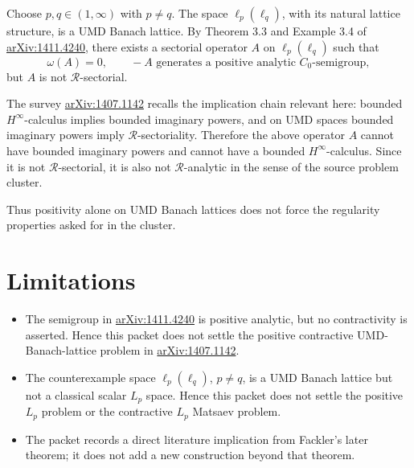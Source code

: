 \documentclass[11pt]{article}
\newcommand{\arxiv}[1]{\href{https://arxiv.org/abs/#1}{arXiv:#1}}
\newcommand{\R}{\mathcal R}
\begin{document}
Choose \(p,q\in(1,\infty)\) with \(p\ne q\).  The space
\(\ell_p(\ell_q)\), with its natural lattice structure, is a UMD Banach
lattice.  By Theorem 3.3 and Example 3.4 of \arxiv{1411.4240}, there exists a
sectorial operator \(A\) on \(\ell_p(\ell_q)\) such that
\[
  \omega(A)=0,
  \qquad
  -A \text{ generates a positive analytic } C_0\text{-semigroup},
\]
but \(A\) is not \(\R\)-sectorial.

The survey \arxiv{1407.1142} recalls the implication chain relevant here:
bounded \(H^\infty\)-calculus implies bounded imaginary powers, and on UMD
spaces bounded imaginary powers imply \(\R\)-sectoriality.  Therefore the above
operator \(A\) cannot have bounded imaginary powers and cannot have a bounded
\(H^\infty\)-calculus.  Since it is not \(\R\)-sectorial, it is also not
\(\R\)-analytic in the sense of the source problem cluster.

Thus positivity alone on UMD Banach lattices does not force the regularity
properties asked for in the cluster.

\section*{Limitations}

\begin{itemize}
\item The semigroup in \arxiv{1411.4240} is positive analytic, but no
  contractivity is asserted.  Hence this packet does not settle the positive
  contractive UMD-Banach-lattice problem in \arxiv{1407.1142}.
\item The counterexample space \(\ell_p(\ell_q)\), \(p\ne q\), is a UMD
  Banach lattice but not a classical scalar \(L_p\) space.  Hence this packet
  does not settle the positive \(L_p\) problem or the contractive \(L_p\)
  Matsaev problem.
\item The packet records a direct literature implication from Fackler's later
  theorem; it does not add a new construction beyond that theorem.
\end{itemize}
\end{document}
